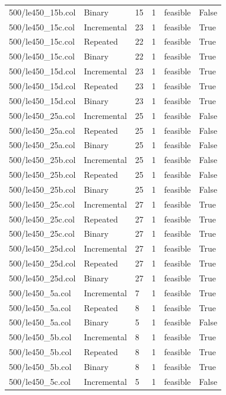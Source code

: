 \begin{table}[htbp]
\begin{tabular}{llllll}
500/le450\_15b.col & Binary & 15 & 1 & feasible & False \\
500/le450\_15c.col & Incremental & 23 & 1 & feasible & True \\
500/le450\_15c.col & Repeated & 22 & 1 & feasible & True \\
500/le450\_15c.col & Binary & 22 & 1 & feasible & True \\
500/le450\_15d.col & Incremental & 23 & 1 & feasible & True \\
500/le450\_15d.col & Repeated & 23 & 1 & feasible & True \\
500/le450\_15d.col & Binary & 23 & 1 & feasible & True \\
500/le450\_25a.col & Incremental & 25 & 1 & feasible & False \\
500/le450\_25a.col & Repeated & 25 & 1 & feasible & False \\
500/le450\_25a.col & Binary & 25 & 1 & feasible & False \\
500/le450\_25b.col & Incremental & 25 & 1 & feasible & False \\
500/le450\_25b.col & Repeated & 25 & 1 & feasible & False \\
500/le450\_25b.col & Binary & 25 & 1 & feasible & False \\
500/le450\_25c.col & Incremental & 27 & 1 & feasible & True \\
500/le450\_25c.col & Repeated & 27 & 1 & feasible & True \\
500/le450\_25c.col & Binary & 27 & 1 & feasible & True \\
500/le450\_25d.col & Incremental & 27 & 1 & feasible & True \\
500/le450\_25d.col & Repeated & 27 & 1 & feasible & True \\
500/le450\_25d.col & Binary & 27 & 1 & feasible & True \\
500/le450\_5a.col & Incremental & 7 & 1 & feasible & True \\
500/le450\_5a.col & Repeated & 8 & 1 & feasible & True \\
500/le450\_5a.col & Binary & 5 & 1 & feasible & False \\
500/le450\_5b.col & Incremental & 8 & 1 & feasible & True \\
500/le450\_5b.col & Repeated & 8 & 1 & feasible & True \\
500/le450\_5b.col & Binary & 8 & 1 & feasible & True \\
500/le450\_5c.col & Incremental & 5 & 1 & feasible & False \\

\end{tabular}
\end{table}
